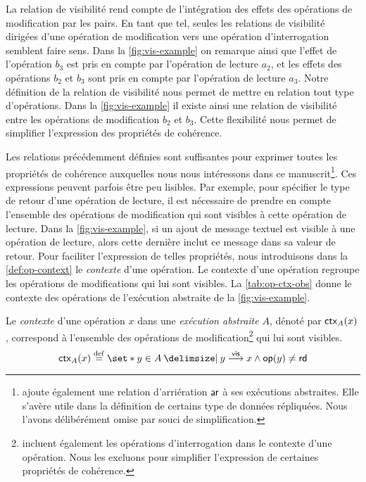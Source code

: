 La relation de visibilité rend compte de l'intégration des effets des opérations de modification par les pairs.
En tant que tel, seules les relations de visibilité dirigées d'une opération de modification vers une opération d'interrogation semblent faire sens.
Dans la \autoref{fig:vis-example} on remarque ainsi que l'effet de l'opération $b_3$ est pris en compte par l'opération de lecture $a_2$, et les effets des opérations $b_2$ et $b_3$ sont pris en compte par l'opération de lecture $a_3$.
Notre définition de la relation de visibilité nous permet de mettre en relation tout type d'opérations.
Dans la \autoref{fig:vis-example} il existe ainsi une relation de visibilité entre les opérations de modification $b_2$ et $b_3$.
Cette flexibilité nous permet de simplifier l'expression des propriétés de cohérence.

Les relations précédemment définies sont suffisantes pour exprimer toutes les propriétés de cohérence auxquelles nous nous intéressons dans ce manuscrit\footnote{\textcite{burckhardt_eventualconsistency_2014} ajoute également une relation d'arriération $\operatorname{\mathsf{ar}}$ à ses exécutions abstraites. Elle s'avère utile dans la définition de certains type de données répliquées. Nous l'avons délibérément omise par souci de simplification.}.
Ces expressions peuvent parfois être peu lisibles.
Par exemple, pour spécifier le type de retour d'une opération de lecture, il est nécessaire de prendre en compte l'ensemble des opérations de modification qui sont visibles à cette opération de lecture.
Dans la \autoref{fig:vis-example}, si un ajout de message textuel est visible à une opération de lecture, alors cette dernière inclut ce message dans sa valeur de retour.
Pour faciliter l'expression de telles propriétés, nous introduisons dans la \autoref{def:op-context} le \emph{contexte} d'une opération.
Le contexte d'une opération regroupe les opérations de modifications qui lui sont visibles.
La \autoref{tab:op-ctx-obs} donne le contexte des opérations de l'exécution abstraite de la \autoref{fig:vis-example}.

\begin{definition}[Contexte]\label{def:op-context}
Le \emph{contexte} d'une opération $x$ dans une \emph{exécution abstraite} $A$, dénoté par $\operatorname{\mathsf{ctx}}_A(x)$, correspond à l'ensemble des opérations de modification\footnote{\textcite{burckhardt_eventualconsistency_2014,viotti_consistency_2016} incluent également les opérations d'interrogation dans le contexte d'une opération. Nous les excluons pour simplifier l'expression de certaines propriétés de cohérence.} qui lui sont visibles.
\begin{equation*}
    \trm{ctx}_A(x) \defeq \set*{y \in A \given y \vis x \land \trm{op}(y) \neq \trm{rd}}
\end{equation*}
\end{definition}

